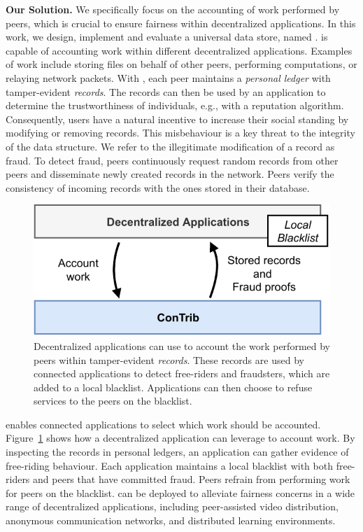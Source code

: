
\textbf{Our Solution.}
We specifically focus on the accounting of work performed by peers, which is crucial to ensure fairness within decentralized applications.
In this work, we design, implement and evaluate a universal data store, named \TrustChain{}.
\TrustChain{} is capable of accounting work within different decentralized applications.
Examples of work include storing files on behalf of other peers, performing computations, or relaying network packets.
With \TrustChain{}, each peer maintains a \emph{personal ledger} with tamper-evident \emph{records}.
The \TrustChain{} records can then be used by an application to determine the trustworthiness of individuals, e.g., with a reputation algorithm.
Consequently, users have a natural incentive to increase their social standing by modifying or removing records.
This misbehaviour is a key threat to the integrity of the \TrustChain{} data structure.
We refer to the illegitimate modification of a record as fraud.
To detect fraud, peers continuously request random records from other peers and disseminate newly created records in the network.
Peers verify the consistency of incoming records with the ones stored in their database.

\begin{figure}[t]
	\centering
	\includegraphics[width=.6\linewidth]{trustchain/assets/contrib_app_interaction}
	\caption{Decentralized applications can use \TrustChain{} to account the work performed by peers within tamper-evident \emph{records}. These records are used by connected applications to detect free-riders and fraudsters, which are added to a local blacklist. Applications can then choose to refuse services to the peers on the blacklist.}
	\label{fig:interaction_with_apps}
\end{figure}

\TrustChain{} enables connected applications to select which work should be accounted.
Figure~\ref{fig:interaction_with_apps} shows how a decentralized application can leverage \TrustChain{} to account work.
By inspecting the records in personal ledgers, an application can gather evidence of free-riding behaviour.
Each application maintains a local blacklist with both free-riders and peers that have committed fraud.
Peers refrain from performing work for peers on the blacklist.
\TrustChain{} can be deployed to alleviate fairness concerns in a wide range of decentralized applications, including peer-assisted video distribution, anonymous communication networks, and distributed learning environments.


